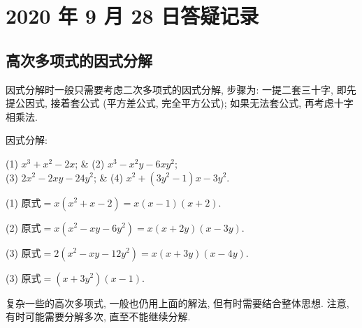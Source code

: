 \section{2020 年 9 月 28 日答疑记录}

\subsection{高次多项式的因式分解}

因式分解时一般只需要考虑二次多项式的因式分解, 步骤为: 一提二套三十字, 即先提公因式, 接着套公式 (平方差公式, 完全平方公式); 如果无法套公式, 再考虑十字相乘法.

\begin{example}
  因式分解:
  \begin{twocolpro}
  (1) $x^3+x^2-2x$; & (2) $x^3-x^2 y-6xy^2$;\\
  (3) $2x^2-2xy-24y^2$; & (4) $x^2+(3y^2-1)x- 3y^2$.
  \end{twocolpro}
\end{example}
\begin{solution}
  (1) $\text{原式}= x(x^2+x-2)= x(x-1)(x+2)$.
  
  (2) $\text{原式}= x(x^2-xy-6y^2)= x(x+2y)(x-3y)$.
  
  (3) $\text{原式}= 2(x^2-xy-12y^2)= x(x+3y)(x-4y)$.
  
  (3) $\text{原式}= (x+3y^2)(x-1)$.
\end{solution}

复杂一些的高次多项式, 一般也仍用上面的解法, 但有时需要结合整体思想. 注意, 有时可能需要分解多次, 直至不能继续分解.

